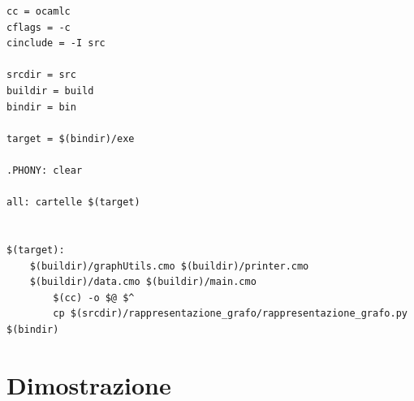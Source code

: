 \begin{lstlisting}[style=make, caption={Breve estratto del file Makefile}]
cc = ocamlc
cflags = -c
cinclude = -I src

srcdir = src
buildir = build
bindir = bin

target = $(bindir)/exe

.PHONY: clear

all: cartelle $(target)


$(target): 
	$(buildir)/graphUtils.cmo $(buildir)/printer.cmo 
	$(buildir)/data.cmo $(buildir)/main.cmo
		$(cc) -o $@ $^
		cp $(srcdir)/rappresentazione_grafo/rappresentazione_grafo.py $(bindir)

\end{lstlisting}
\section{Dimostrazione}






